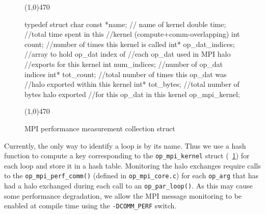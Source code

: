 \documentclass[11pt]{article}
\begin{document}
\begin{figure}[t]\small
\vspace{-0pt}\noindent\line(1,0){470}\vspace{-10pt}
\begin{pyglist}[language=c]
typedef struct
{
  char const  *name;   // name of kernel
  double      time;    //total time spent in this
                       //kernel (compute+comm-overlapping)
  int         count;   //number of times this kernel is called
  int*        op_dat_indices;  //array to hold op_dat index of
                               //each op_dat used in MPI halo
                               //exports for this kernel
  int         num_indices; //number of op_dat indices
  int*        tot_count;   //total number of times this op_dat was
                           //halo exported within this kernel
  int*        tot_bytes;   //total number of bytes halo exported
                           //for this op_dat in this kernel
} op_mpi_kernel;
\end{pyglist}
\vspace{-10pt}\noindent\line(1,0){470}\vspace{-10pt}
\caption{\small MPI performance measurement collection struct}
\normalsize\vspace{-0pt}\label{fig:perf}
\end{figure}

Currently, the only way to identify a loop is by its name. Thus we use a hash function to compute a key corresponding to
the \texttt{op\_mpi\_kernel} struct (\figurename{~\ref{fig:perf}}) for each loop and store it in a hash table.
Monitoring the halo exchanges require calls to the \texttt{op\_mpi\_perf\_comm()} (defined in \texttt{op\_mpi\_core.c})
for each \texttt{op\_arg} that has had a halo exchanged during each call to an \texttt{op\_par\_loop()}. As this may
cause some performance degradation, we allow the MPI message monitoring to be enabled at compile time using the
\texttt{-DCOMM\_PERF} switch.

\end{document}
